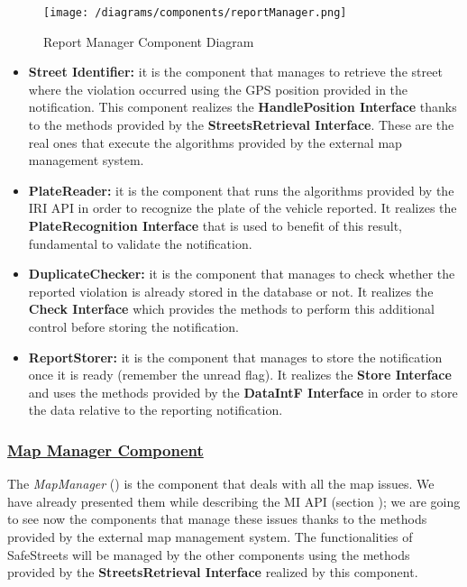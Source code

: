 			\begin{figure}[ht]
				\centering
				\texttt{[image: /diagrams/components/reportManager.png]}
				\caption{\label{fig:reportManagerComp} Report Manager Component Diagram}
			\end{figure}
		
			\begin{itemize}
				\item \textbf{Street Identifier:} it is the component that manages to retrieve the street where the violation occurred using the GPS position provided in the notification. This component realizes the \textbf{HandlePosition Interface} thanks to the methods provided by the \textbf{StreetsRetrieval Interface}. These are the real ones that execute the algorithms provided by the external map management system.
				
				\item \textbf{PlateReader:} it is the component that runs the algorithms provided by the IRI API in order to recognize the plate of the vehicle reported. It realizes the \textbf{PlateRecognition Interface} that is used to benefit of this result, fundamental to validate the notification.
				
				\item \textbf{DuplicateChecker:} it is the component that manages to check whether the reported violation is already stored in the database or not. It realizes the \textbf{Check Interface} which provides the methods to perform this additional control before storing the notification.
				
				\item \textbf{ReportStorer:} it is the component that manages to store the notification once it is ready (remember the unread flag). It realizes the \textbf{Store Interface} and uses the methods provided by the \textbf{DataIntF Interface} in order to store the data relative to the reporting notification.
			\end{itemize}
		
		\subsubsection[Map Manager Component]{\hyperlink{toc}{Map Manager Component}}
			\label{sec:mapManagerComponent}
			
			The \emph{MapManager} () is the component that deals with all the map issues. We have already presented them while describing the MI API (section ); we are going to see now the components that manage these issues thanks to the methods provided by the external map management system. The functionalities of SafeStreets will be managed by the other components using the methods provided by the \textbf{StreetsRetrieval Interface} realized by this component.\\
			
